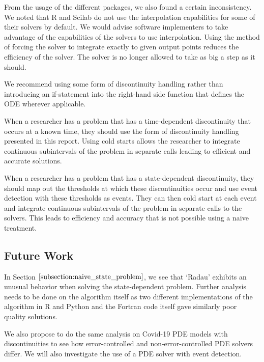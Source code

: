 From the usage of the different packages, we also found a certain inconsistency. We noted that R and Scilab do not use the interpolation capabilities for some of their solvers by default. We would advise software implementers to take advantage of the capabilities of the solvers to use interpolation. Using the method of forcing the solver to integrate exactly to given output points reduces the efficiency of the solver. The solver is no longer allowed to take as big a step as it should.

We recommend using some form of discontinuity handling rather than introducing an if-statement into the right-hand side function that defines the ODE wherever applicable.

When a researcher has a problem that has a time-dependent discontinuity that occurs at a known time, they should use the form of discontinuity handling presented in this report. Using cold starts allows the researcher to integrate continuous subintervals of the problem in separate calls leading to efficient and accurate solutions.

When a researcher has a problem that has a state-dependent discontinuity, they should map out the thresholds at which these discontinuities occur and use event detection with these thresholds as events. They can then cold start at each event and integrate continuous subintervals of the problem in separate calls to the solvers. This leads to efficiency and accuracy that is not possible using a naive treatment. 

\subsection{Future Work}
\label{subsection:future_work}
In Section $\ref{subsection:naive_state_problem}$, we see that `Radau' exhibits an unusual behavior when solving the state-dependent problem. Further analysis needs to be done on the algorithm itself as two different implementations of the algorithm in R and Python and the Fortran code itself gave similarly poor quality solutions.

We also propose to do the same analysis on Covid-19 PDE models with discontinuities to see how error-controlled and non-error-controlled PDE solvers differ. We will also investigate the use of a PDE solver with event detection.


